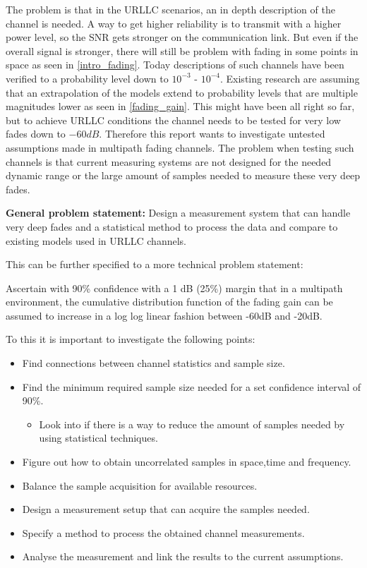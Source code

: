 The problem is that in the URLLC scenarios, an in depth description of the channel is needed. A way to get higher reliability is to transmit with a higher power level, so the \gls{SNR} gets stronger on the communication link. But even if the overall signal is stronger, there will still be problem with fading in some points in space as seen in \autoref{intro_fading}. Today descriptions of such channels have been verified to a probability level down to $10^{-3}$ - $10^{-4}$. Existing research are assuming that an extrapolation of the models extend to probability levels that are multiple magnitudes lower as seen in \autoref{fading_gain}. This might have been all right so far, but to achieve URLLC conditions the channel needs to be tested for very low fades down to $-60dB$. Therefore this report wants to investigate untested assumptions made in multipath fading channels. The problem when testing such channels is that current measuring systems are not designed for the needed dynamic range or the large amount of samples needed to measure these very deep fades. 

\textbf{General problem statement:}
Design a measurement system that can handle very deep fades and a statistical method to process the data and compare to existing models used in URLLC channels.

This can be further specified to a more technical problem statement: 

Ascertain with 90\% confidence with a 1 dB (25\%) margin that in a multipath environment, the cumulative distribution function of the fading gain can be assumed to increase in a log log linear fashion between -60dB and -20dB.

To this it is important to investigate the following points: 

\begin{itemize}
	\item Find connections between channel statistics and sample size.
	\item Find the minimum required sample size needed for a set confidence interval of 90\%.
	\begin{itemize}
	\item Look into if there is a way to 		reduce the amount of samples 	needed by using statistical techniques.
 	\end{itemize}
	\item Figure out how to obtain uncorrelated samples in space,time and frequency.
	\item Balance the sample acquisition for available resources. 
	\item Design  a measurement setup that can acquire the samples needed.
	\item Specify a method to process the obtained channel measurements.
	\item Analyse the measurement and link the results to the current assumptions.
\end{itemize}

